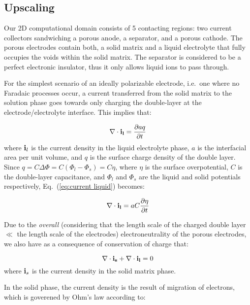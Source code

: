 \subsection{Upscaling}

Our 2D computational domain consists of 5 contacting regions: two current collectors sandwiching a porous anode, a separator, and a porous cathode. The porous electrodes contain both, a solid matrix and a liquid electrolyte that fully occupies the voids within the solid matrix. The separator is considered to be a perfect electronic insulator, thus it only allows liquid ions to pass through. 

For the simplest scenario of an ideally polarizable electrode, i.e.\ one where no Faradaic processes occur, a current transferred from the solid matrix to the solution phase goes towards only charging the double-layer at the electrode/electrolyte interface. This implies that:

\begin{equation}
\nabla \cdot \bold{i_l} = \frac{\partial a q}{\partial t}
\label{eq:current liquid}
\end{equation}
where $\bold i_l$ is the current density in the liquid electrolyte phase, $a$ is the interfacial area per unit volume, and $q$ is the surface charge density of the double layer. 
Since $q = C \Delta \Phi = C (\Phi_l - \Phi_s) = C \eta$, where $\eta$ is the surface overpotential, $C$ is the double-layer capacitance, and $\Phi_l$ and $\Phi_s$ are the liquid and solid potentials respectively,  Eq.~(\ref{eq:current liquid}) becomes:

\begin{equation}
\nabla \cdot \bold{i_l} = aC \frac{\partial \eta}{\partial t}
\label{eq:current liquid capacitance}
\end{equation}

Due to the {\it overall} (considering that the length scale of the charged double layer $\ll$ the length scale of the electrodes) electroneutrality of the porous electrodes, we also have as a consequence of conservation of charge that:

\begin{equation}
\nabla \cdot \bold{i_s}  + \nabla \cdot \bold{i_l} = 0
\label{eq:charge conservation}
\end{equation}
where $\bold i_s$ is the current density in the solid matrix phase.

In the solid phase, the current density is the result of migration of electrons, which is goverened by Ohm's law according to:

